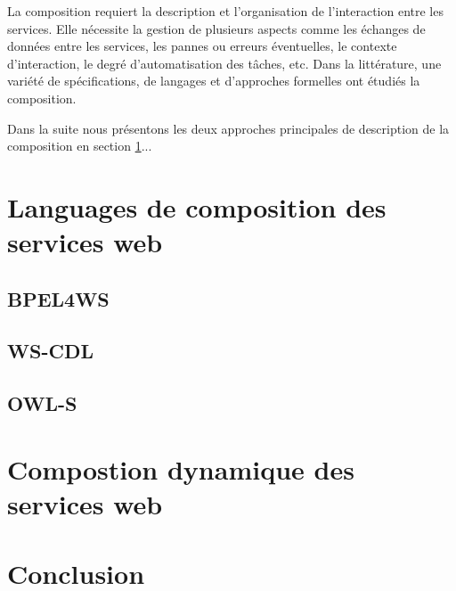       La composition requiert la description et l'organisation de
      l'interaction entre les services. Elle nécessite la gestion de
      plusieurs aspects comme les échanges de données entre les
      services, les pannes ou erreurs éventuelles, le contexte
      d'interaction, le degré d'automatisation des tâches, etc. Dans
      la littérature, une variété de spécifications, de langages et
      d'approches formelles ont étudiés la composition.

      Dans la suite nous présentons les deux approches principales
      de description de la composition en section \ref{sec:lang-de-comp}...


  \section{Languages de composition des services web}
  \label{sec:lang-de-comp}

    \subsection{BPEL4WS}
    \label{sec:bpel4ws}

    \subsection{WS-CDL}
    \label{WS-CDL}

    \subsection{OWL-S}
    \label{sec:owl-s}


  \section{Compostion dynamique des services web}
  \label{sec:comp-dynam}
 
  \section{Conclusion}  
  \label{sec:conclusion}
 

